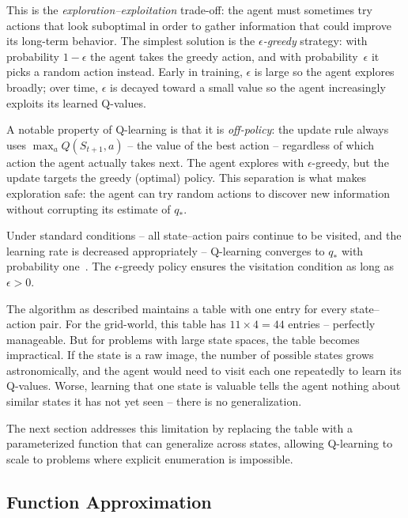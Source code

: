 

\smallskip
This is the \emph{exploration--exploitation} trade-off: the agent
must sometimes try actions that look suboptimal in order to gather
information that could improve its long-term behavior. The
simplest solution is the $\epsilon$\emph{-greedy} strategy: with
probability $1 - \epsilon$ the agent takes the greedy action, and
with probability~$\epsilon$ it picks a random action instead.
Early in training, $\epsilon$ is large so the agent explores
broadly; over time, $\epsilon$ is decayed toward a small value so
the agent increasingly exploits its learned Q-values.

\smallskip
A notable property of Q-learning is that it is \emph{off-policy}:
the update rule always uses $\max_a Q(S_{t+1}, a)$ -- the value
of the best action -- regardless of which action the agent
actually takes next. The agent explores with $\epsilon$-greedy,
but the update targets the greedy (optimal) policy. This
separation is what makes exploration safe: the agent can try
random actions to discover new information without corrupting its
estimate of $q_*$.

\smallskip
Under standard conditions -- all state--action pairs continue to
be visited, and the learning rate is decreased
appropriately -- Q-learning converges to $q_*$ with probability
one~\citep{watkins1992q}. The $\epsilon$-greedy policy ensures
the visitation condition as long as $\epsilon > 0$.

\smallskip
The algorithm as described maintains a table with one entry for
every state--action pair. For the grid-world, this table has
$11 \times 4 = 44$ entries -- perfectly manageable. But for
problems with large state spaces, the table becomes impractical.
If the state is a raw image, the number of possible states grows
astronomically, and the agent would need to visit each one
repeatedly to learn its Q-values. Worse, learning that one state
is valuable tells the agent nothing about similar states it has
not yet seen -- there is no generalization.

\smallskip
The next section addresses this limitation by replacing the table
with a parameterized function that can generalize across states,
allowing Q-learning to scale to problems where explicit
enumeration is impossible.

\subsection{Function Approximation}
\label{subsec:func-approx}

